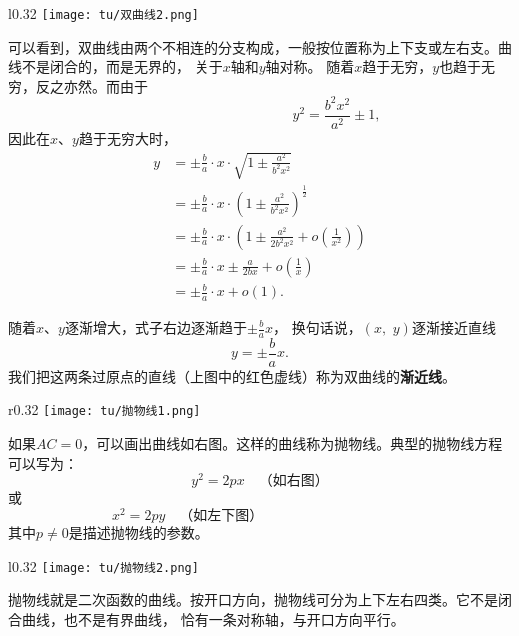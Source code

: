 \documentclass[12pt,UTF8]{ctexbook}
\newcommand{\olim}[1]{\mathit{o}\left(#1\right)}  %
\theoremstyle{definition}
\theoremstyle{plain}
\begin{document}
\begin{wrapfigure}[5]{l}{0.32\textwidth} 
    \vspace{-28pt}
    \flushright
    \texttt{[image: tu/双曲线2.png]}
\end{wrapfigure}

可以看到，双曲线由两个不相连的分支构成，一般按位置称为上下支或左右支。曲线不是闭合的，而是无界的，
关于$x$轴和$y$轴对称。
随着$x$趋于无穷，$y$也趋于无穷，反之亦然。而由于
$$ \phantom{123455}\qquad \qquad \qquad \qquad y^2 = \frac{b^2x^2}{a^2} \pm 1, $$
因此在$x$、$y$趋于无穷大时，
\begin{align*}
    y &= \pm \frac{b}{a} \cdot x \cdot \sqrt{1 \pm \frac{a^2}{b^2x^2}} \\ 
    &= \pm \frac{b}{a} \cdot x \cdot \left(1 \pm \frac{a^2}{b^2x^2}\right)^{\frac{1}{2}} \\
    &= \pm \frac{b}{a} \cdot x \cdot \left(1 \pm \frac{a^2}{2b^2x^2} + \olim{\frac{1}{x^2}} \right)\\
    &= \pm \frac{b}{a} \cdot x \pm \frac{a}{2bx} + \olim{\frac{1}{x}} \\
    &= \pm \frac{b}{a} \cdot x + \olim{1}.
\end{align*}

随着$x$、$y$逐渐增大，式子右边逐渐趋于$\displaystyle\pm \frac{b}{a} x$，
换句话说，$(x, \,\, y)$逐渐接近直线
$$ y = \pm \frac{b}{a}x. $$
我们把这两条过原点的直线（上图中的红色虚线）称为双曲线的\textbf{渐近线}。

\begin{wrapfigure}[5]{r}{0.32\textwidth} %
    \flushright
    \texttt{[image: tu/抛物线1.png]}
\end{wrapfigure}

如果$AC = 0$，可以画出曲线如右图。这样的曲线称为抛物线。典型的抛物线方程可以写为：
$$ y^2 = 2px  \quad \mbox{（如右图）} $$
或
$$ x^2 = 2py  \quad \mbox{（如左下图）} \qquad  \qquad  \qquad  \qquad\;\;\; \phantom{123}$$
其中$p \neq 0$是描述抛物线的参数。

\begin{wrapfigure}[5]{l}{0.32\textwidth} %
    \vspace{-30pt}
    \flushright
    \texttt{[image: tu/抛物线2.png]}
\end{wrapfigure}

抛物线就是二次函数的曲线。按开口方向，抛物线可分为上下左右四类。它不是闭合曲线，也不是有界曲线，
恰有一条对称轴，与开口方向平行。
\end{document}
